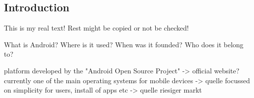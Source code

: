 \subsection{Introduction} \label{subsection:android-introduction}
This is my real text! Rest might be copied or not be checked!


What is Android? Where is it used? When was it founded? Who does it belong to?\newline


platform developed by the "Android Open Source Project" -> official website?\newline
currently one of the main operating systems for mobile devices -> quelle\newline
focussed on simplicity for users, install of apps etc -> quelle\newline
riesiger markt\newline
